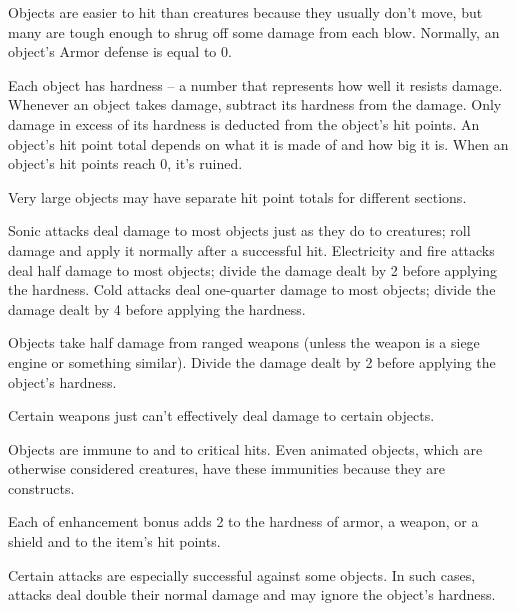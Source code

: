  Objects are easier to hit than creatures because they usually don't move, but many are tough enough to shrug off some damage from each blow.
Normally, an object's Armor defense is equal to 0.

 Each object has hardness -- a number that represents how well it resists damage. Whenever an object takes damage, subtract its hardness from the damage. Only damage in excess of its hardness is deducted from the object's hit points.
 An object's hit point total depends on what it is made of and how big it is. When an object's hit points reach 0, it's ruined.

Very large objects may have separate hit point totals for different sections.

 Sonic attacks deal damage to most objects just as they do to creatures; roll damage and apply it normally after a successful hit. Electricity and fire attacks deal half damage to most objects; divide the damage dealt by 2 before applying the hardness. Cold attacks deal one-quarter damage to most objects; divide the damage dealt by 4 before applying the hardness.

 Objects take half damage from ranged weapons (unless the weapon is a siege engine or something similar). Divide the damage dealt by 2 before applying the object's hardness.

 Certain weapons just can't effectively deal damage to certain objects.

 Objects are immune to  and to critical hits. Even animated objects, which are otherwise considered creatures, have these immunities because they are constructs.

 Each  of enhancement bonus adds 2 to the hardness of armor, a weapon, or a shield and  to the item's hit points.

 Certain attacks are especially successful against some objects. In such cases, attacks deal double their normal damage and may ignore the object's hardness.

